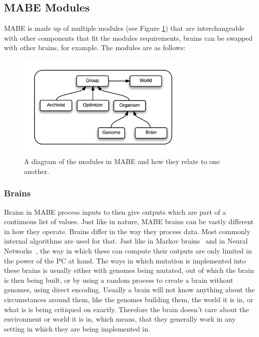 \documentclass[12pt,oneside,listof=totoc,paper=a4,headings=small]{scrbook}
\begin{document}
\subsection{MABE Modules}
MABE is made up of multiple modules (see Figure \ref{fig:MABE_Modules}) that are interchangeable with other components that fit the modules requirements, brains can be swapped with other brains, for example. The modules are as follows: 
\begin{figure}[h!]
\centering
\includegraphics[width=0.75\textwidth,height=0.75\textheight,keepaspectratio]{images/MABE_Overview.png}
\caption{A diagram of the modules in MABE and how they relate to one another.~\cite{mabeModuleChart}}
\label{fig:MABE_Modules}
\end{figure}


\subsubsection{Brains}
Brains in MABE process inputs to then give outputs which are part of a continuous list of values. Just like in nature, MABE brains can be vastly different in how they operate. Brains differ in the way they process data. Most commonly internal algorithms are used for that. Just like in Markov brains~\cite{hintze2017markov} and in Neural Networks~\cite{russell1995modern}, the way in which these can compute their outputs are only limited in the power of the PC at hand. The ways in which mutation is implemented into these brains is usually either with genomes being mutated, out of which the brain is then being built, or by using a random process to create a brain without genomes, using direct encoding. 
Usually a brain will not know anything about the circumstances around them, like the genomes building them, the world it is in, or what is is being critiqued on exactly. Therefore the brain doesn't care about the environment or world it is in, which means, that they generally work in any setting in which they are being implemented in. 
\end{document}
